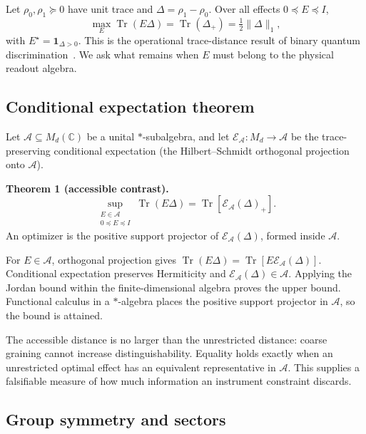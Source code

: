 \documentclass[letterpaper,journal]{IEEEtran}
\newcommand{\Tr}{\operatorname{Tr}}
\newcommand{\A}{\mathcal A}
\newcommand{\C}{\mathbb C}
\begin{document}
Let $\rho_0,\rho_1\succeq0$ have unit trace and
$\Delta=\rho_1-\rho_0$. Over all effects $0\preceq E\preceq I$,
\begin{equation}
\max_E\Tr(E\Delta)=\Tr(\Delta_+)=\tfrac12\|\Delta\|_1, \label{eq:helstrom}
\end{equation}
with $E^\star=\mathbf1_{\Delta>0}$. This is the operational trace-distance
result of binary quantum discrimination~\cite{helstrom1976}. We ask what
remains when $E$ must belong to the physical readout algebra.

\subsection{Conditional expectation theorem}

Let $\A\subseteq M_d(\C)$ be a unital $*$-subalgebra, and let
$\mathcal E_\A:M_d\rightarrow\A$ be the trace-preserving conditional
expectation (the Hilbert--Schmidt orthogonal projection onto $\A$).

\textbf{Theorem 1 (accessible contrast).}
\begin{equation}
\sup_{\substack{E\in\A\\0\preceq E\preceq I}}\Tr(E\Delta)
=\Tr\!\left[\mathcal E_\A(\Delta)_+\right].          \label{eq:algebra}
\end{equation}
An optimizer is the positive support projector of
$\mathcal E_\A(\Delta)$, formed inside $\A$.

\begin{IEEEproof}
For $E\in\A$, orthogonal projection gives
$\Tr(E\Delta)=\Tr[E\mathcal E_\A(\Delta)]$.
Conditional expectation preserves Hermiticity and
$\mathcal E_\A(\Delta)\in\A$. Applying the Jordan bound within the
finite-dimensional algebra proves the upper bound. Functional calculus in a
$*$-algebra places the positive support projector in $\A$, so the bound is
attained.
\end{IEEEproof}

The accessible distance is no larger than the unrestricted distance:
coarse graining cannot increase distinguishability. Equality holds exactly
when an unrestricted optimal effect has an equivalent representative in
$\A$. This supplies a falsifiable measure of how much information an
instrument constraint discards.

\subsection{Group symmetry and sectors}
\end{document}
